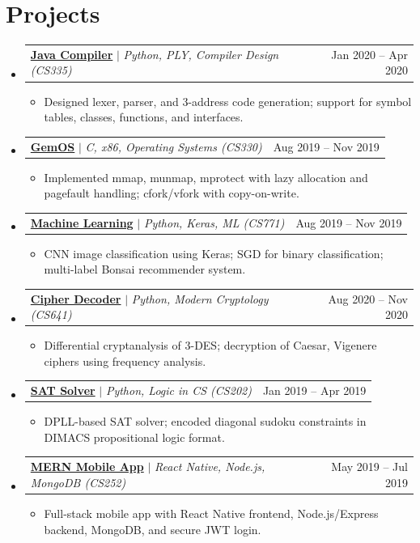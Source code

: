 \documentclass[a4paper,9pt]{extarticle}
\makeatletter
\newcommand{\resumeProjectHeading}[2]{
    \item
    \begin{tabular*}{0.97\textwidth}{l@{\extracolsep{\fill}}r}
      \small #1 & #2 \\
    \end{tabular*}\vspace{-7pt}
}
\newcommand{\resumeItemPlain}[1]{
  \item\small{#1 \vspace{-3pt}}
}
\newcommand{\resumeSubHeadingListStart}{\begin{itemize}[leftmargin=0.15in, label={}]}
\newcommand{\resumeSubHeadingListEnd}{\end{itemize}}
\newcommand{\resumeItemListStart}{\begin{itemize}}
\newcommand{\resumeItemListEnd}{\end{itemize}\vspace{-6pt}}
\makeatother
\begin{document}
\section{Projects}
  \resumeSubHeadingListStart
    \resumeProjectHeading
      {\href{https://github.com/shivamkm/java-compiler}{\textbf{Java Compiler}} $|$ \emph{Python, PLY, Compiler Design (CS335)}}{Jan 2020 -- Apr 2020}
      \resumeItemListStart
        \resumeItemPlain{Designed lexer, parser, and 3-address code generation; support for symbol tables, classes, functions, and interfaces.}
      \resumeItemListEnd
    \resumeProjectHeading
      {\href{https://github.com/shivamkm/gemOS}{\textbf{GemOS}} $|$ \emph{C, x86, Operating Systems (CS330)}}{Aug 2019 -- Nov 2019}
      \resumeItemListStart
        \resumeItemPlain{Implemented mmap, munmap, mprotect with lazy allocation and pagefault handling; cfork/vfork with copy-on-write.}
      \resumeItemListEnd
    \resumeProjectHeading
      {\href{https://github.com/shivamkm/machine-learning}{\textbf{Machine Learning}} $|$ \emph{Python, Keras, ML (CS771)}}{Aug 2019 -- Nov 2019}
      \resumeItemListStart
        \resumeItemPlain{CNN image classification using Keras; SGD for binary classification; multi-label Bonsai recommender system.}
      \resumeItemListEnd
    \resumeProjectHeading
      {\href{https://github.com/shivamkm/decipher}{\textbf{Cipher Decoder}} $|$ \emph{Python, Modern Cryptology (CS641)}}{Aug 2020 -- Nov 2020}
      \resumeItemListStart
        \resumeItemPlain{Differential cryptanalysis of 3-DES; decryption of Caesar, Vigenere ciphers using frequency analysis.}
      \resumeItemListEnd
    \resumeProjectHeading
      {\href{https://github.com/shivamkm/sat-solver}{\textbf{SAT Solver}} $|$ \emph{Python, Logic in CS (CS202)}}{Jan 2019 -- Apr 2019}
      \resumeItemListStart
        \resumeItemPlain{DPLL-based SAT solver; encoded diagonal sudoku constraints in DIMACS propositional logic format.}
      \resumeItemListEnd
    \resumeProjectHeading
      {\href{https://github.com/shivamkm/mobile-app}{\textbf{MERN Mobile App}} $|$ \emph{React Native, Node.js, MongoDB (CS252)}}{May 2019 -- Jul 2019}
      \resumeItemListStart
        \resumeItemPlain{Full-stack mobile app with React Native frontend, Node.js/Express backend, MongoDB, and secure JWT login.}
      \resumeItemListEnd
  \resumeSubHeadingListEnd

\end{document}
